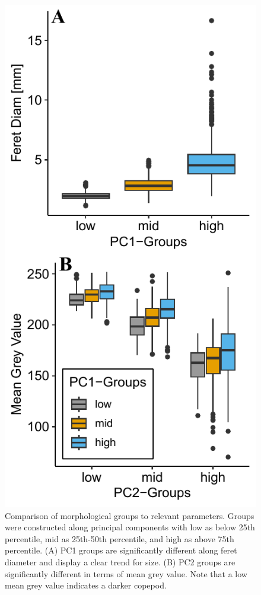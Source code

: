 \documentclass[
  letterpaper,
  DIV=11,
  numbers=noendperiod]{scrartcl}
\begin{document}
\begin{figure}

{\centering \includegraphics{../media/figure_02.pdf}

}

\caption{Comparison of morphological groups to relevant parameters.
Groups were constructed along principal components with low as below
25th percentile, mid as 25th-50th percentile, and high as above 75th
percentile. (A) PC1 groups are significantly different along feret
diameter and display a clear trend for size. (B) PC2 groups are
significantly different in terms of mean grey value. Note that a low
mean grey value indicates a darker copepod.}

\end{figure}
\end{document}
